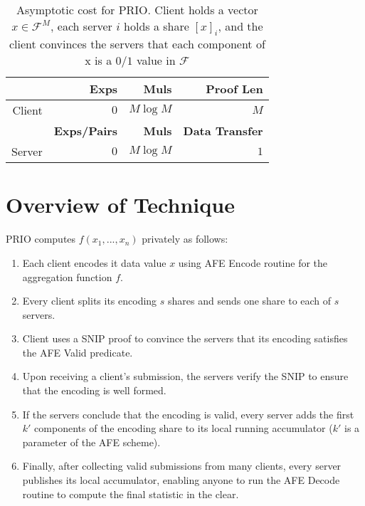 \begin{table}
	\centering
	\begin{tabular}{ |r|r|r|r| } 
		\hline
		& \textbf{Exps} & \textbf{Muls} & \textbf{Proof Len} \\ \hline
		Client  & $0$ & $M \log M$ & $M$ \\ \hline
		& \textbf{Exps/Pairs} & \textbf{Muls} & \textbf{Data Transfer} \\ \hline
		Server  & $0$ & $M\log M$ & $1$ \\ \hline
	\end{tabular}
	\caption{Asymptotic cost for PRIO. Client holds a vector $x \in \mathcal{F}^M$, each server $i$ holds a share $[x]_i$, and the client convinces the servers that each component of x is a $0/1$ value in $\mathcal{F}$}
        \label{asymptoticcost}
\end{table}


\section{Overview of Technique}
PRIO computes $f(x_1, ..., x_n)$ privately as follows:
\begin{enumerate}
    \item Each client encodes it data value $x$ using AFE Encode routine for the aggregation function $f$.
    \item Every client splits its encoding $s$ shares and sends one share to each of $s$ servers.
    \item Client uses a SNIP proof to convince the servers that its encoding satisfies the AFE Valid predicate.
    \item Upon receiving a client's submission, the servers verify the SNIP to ensure that the encoding is well formed.
    \item If the servers conclude that the encoding is valid, every server adds the first $k'$ components of the encoding share to its local running accumulator ($k'$ is a parameter of the AFE scheme).
    \item Finally, after collecting valid submissions from many clients, every server publishes its local accumulator, enabling anyone to run the AFE Decode routine to compute the final statistic in the clear.
\end{enumerate}



%
